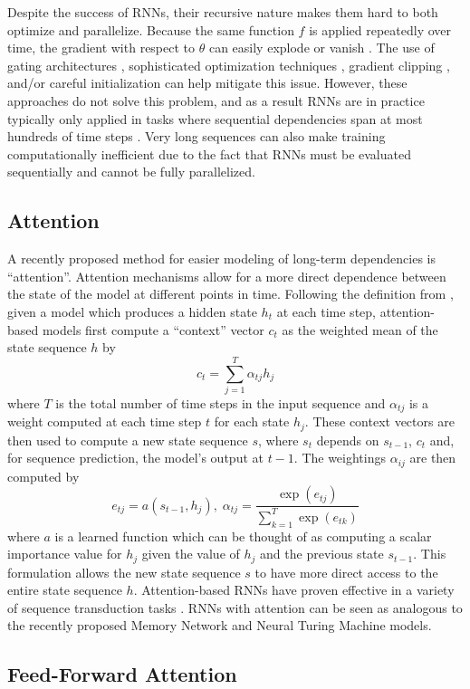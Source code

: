\documentclass{article} %
\begin{document}
Despite the success of RNNs, their recursive nature makes them hard to both optimize and parallelize.
Because the same function $f$ is applied repeatedly over time, the gradient with respect to $\theta$ can easily explode or vanish \cite{}.
The use of gating architectures \cite{}, sophisticated optimization techniques \cite{}, gradient clipping \cite{}, and/or careful initialization \cite{} can help mitigate this issue.
However, these approaches do not solve this problem, and as a result RNNs are in practice typically only applied in tasks where sequential dependencies span at most hundreds of time steps \cite{}.
Very long sequences can also make training computationally inefficient due to the fact that RNNs must be evaluated sequentially and cannot be fully parallelized.

\subsection{Attention}

A recently proposed method for easier modeling of long-term dependencies is ``attention''.
Attention mechanisms allow for a more direct dependence between the state of the model at different points in time.
Following the definition from \cite{}, given a model which produces a hidden state $h_t$ at each time step, attention-based models first compute a ``context'' vector $c_t$ as the weighted mean of the state sequence $h$ by
$$
c_t = \sum_{j = 1}^T \alpha_{tj} h_j
$$
where $T$ is the total number of time steps in the input sequence and $\alpha_{tj}$ is a weight computed at each time step $t$ for each state $h_j$.
These context vectors are then used to compute a new state sequence $s$, where $s_t$ depends on $s_{t - 1}$, $c_t$ and, for sequence prediction, the model's output at $t - 1$.
The weightings $\alpha_{ij}$ are then computed by
$$
e_{tj} = a(s_{t - 1}, h_j),\; \alpha_{tj} = \frac{\exp(e_{tj})}{\sum_{k = 1}^T \exp(e_{tk})}
$$
where $a$ is a learned function which can be thought of as computing a scalar importance value for $h_j$ given the value of $h_j$ and the previous state $s_{t - 1}$.
This formulation allows the new state sequence $s$ to have more direct access to the entire state sequence $h$.
Attention-based RNNs have proven effective in a variety of sequence transduction tasks \cite{}.
RNNs with attention can be seen as analogous to the recently proposed Memory Network \cite{} and Neural Turing Machine \cite{} models.

\subsection{Feed-Forward Attention}
\end{document}
